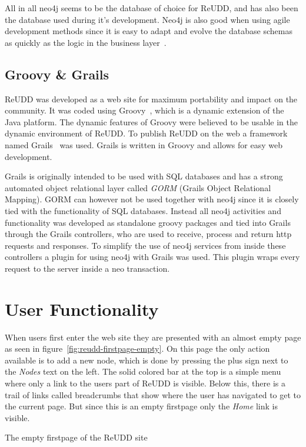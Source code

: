 \documentclass[a4paper]{report}
\begin{document}
All in all neo4j seems to be the database of choice for ReUDD, and has also been the database used during it's development. Neo4j is also good when using agile development methods since it is easy to adapt and evolve the database schemas as quickly as the logic in the business layer~\cite{neo4j-whitepaper}.

\subsection{Groovy \& Grails}
ReUDD was developed as a web site for maximum portability and impact on the community. It was coded using Groovy~\cite{groovy}, which is a dynamic extension of the Java platform. The dynamic features of Groovy were believed to be usable in the dynamic environment of ReUDD. To publish ReUDD on the web a framework named Grails~\cite{grails} was used. Grails is written in Groovy and allows for easy web development.

Grails is originally intended to be used with SQL databases and has a strong automated object relational layer called \emph{GORM} (Grails Object Relational Mapping). GORM can however not be used together with neo4j since it is closely tied with the functionality of SQL databases. Instead all neo4j activities and functionality was developed as standalone groovy packages and tied into Grails through the Grails controllers, who are used to receive, process and return http requests and responses. To simplify the use of neo4j services from inside these controllers a plugin for using neo4j with Grails was used. This plugin wraps every request to the server inside a neo transaction.

\section{User Functionality}
When users first enter the web site they are presented with an almost empty page as seen in figure~\ref{fig:reudd-firstpage-empty}. On this page the only action available is to add a new node, which is done by pressing the plus sign next to the \emph{Nodes} text on the left. The solid colored bar at the top is a simple menu where only a link to the users part of ReUDD is visible. Below this, there is a trail of links called breadcrumbs that show where the user has navigated to get to the current page. But since this is an empty firstpage only the \emph{Home} link is visible.

	{The empty firstpage of the ReUDD site}
\end{document}
